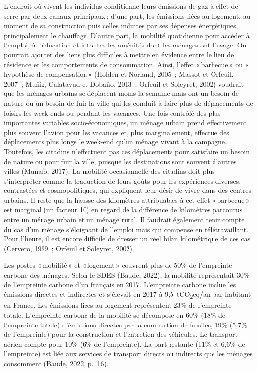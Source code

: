 \documentclass[
  9pt,
  a4paper,
  DIV=11]{scrreprt}
\begin{document}
L'endroit où vivent les individus conditionne leurs émissions de gaz à
effet de serre par deux canaux principaux\,: d'une part, les émissions
liées au logement, au moment de sa construction puis celles induites par
ses dépenses énergétiques, principalement le chauffage. D'autre part, la
mobilité quotidienne pour accéder à l'emploi, à l'éducation et à toutes
les aménités dont les ménages ont l'usage. On pourrait ajouter des liens
plus difficiles à mettre en évidence entre le lieu de résidence et les
comportements de consommation. Ainsi, l'effet «\,barbecue\,» ou
«\,hypothèse de compensation\,» (Holden et Norland, 2005~; Massot et
Orfeuil, 2007~; Muñiz, Calatayud et Dobaño, 2013~; Orfeuil et Soleyret,
2002) voudrait que les ménages urbains se déplacent moins la semaine
mais ont un besoin de nature ou un besoin de fuir la ville qui les
conduit à faire plus de déplacements de loisirs les week-ends ou pendant
les vacances. Une fois contrôlé des plus importantes variables
socio-économiques, un ménage urbain prend effectivement plus souvent
l'avion pour les vacances et, plus marginalement, effectue des
déplacements plus longs le week-end qu'un ménage vivant à la campagne.
Toutefois, les citadins n'effectuent pas ces déplacements pour
satisfaire un besoin de nature ou pour fuir la ville, puisque les
destinations sont souvent d'autres villes (Munafò, 2017). La mobilité
occasionnelle des citadins doit plus s'interpréter comme la traduction
de leurs goûts pour les expériences diverses, contrastées et
cosmopolitiques, qui expliquent leur désir de vivre dans des centres
urbains. Il reste que la hausse des kilomètres attribuables à cet effet
«\,barbecue\,» est marginal (un facteur 10) en regard de la différence
de kilomètres parcourus entre un ménage urbain et un ménage rural. Il
faudrait également tenir compte du cas d'un ménage s'éloignant de
l'emploi mais qui compense en télétravaillant. Pour l'heure, il est
encore difficile de dresser un réel bilan kilométrique de ces cas
(Cervero, 1989~; Orfeuil et Soleyret, 2002).

Les postes «\,mobilité\,» et «\,logement\,» couvrent plus de 50\% de
l'empreinte carbone des ménages. Selon le SDES (Baude, 2022), la
mobilité représentait 30\% de l'empreinte carbone d'un français en 2017.
L'empreinte carbone inclue les émissions directes et indirectes et
s'élevait en 2017 à 9,5~tCO\textsubscript{2}eq/an par habitant en
France. Les émissions liées au logement représentent 23\% de l'empreinte
totale. L'empreinte carbone de la mobilité se décompose en 60\% (18\% de
l'empreinte totale) d'émissions directes par la combustion de fossiles,
19\% (5,7\% de l'empreinte) pour la construction et l'entretien des
véhicules. Le transport aérien compte pour 10\% (6\% de l'empreinte). La
part restante (11\% et 6,6\% de l'empreinte) est liée aux services de
transport directs ou indirects que les ménages consomment (Baude, 2022,
p.~16).
\end{document}
